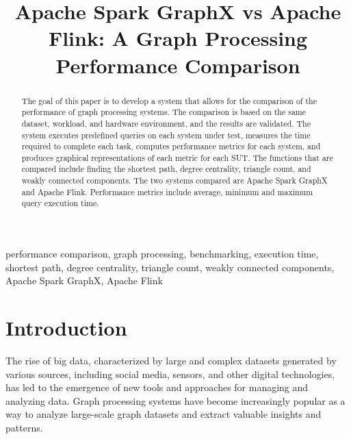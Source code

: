 \documentclass[conference]{IEEEtran}
\begin{document}
\title{Apache Spark GraphX vs Apache Flink: A Graph Processing Performance Comparison\\
}

\author{
\and
{}
}

\maketitle

\begin{abstract}
The goal of this paper is to develop a system that allows for the comparison of the performance of graph processing systems. The comparison is based on the same dataset, workload, and hardware environment, and the results are validated. The system executes predefined queries on each system under test, measures the time required to complete each task, computes performance metrics for each system, and produces graphical representations of each metric for each SUT. The functions that are compared include finding the shortest path, degree centrality, triangle count, and weakly connected components. The two systems compared are Apache Spark GraphX and Apache Flink. Performance metrics include average, minimum and maximum query execution time.
\end{abstract}

\begin{IEEEkeywords}
performance comparison, graph processing, benchmarking, execution time, shortest path, degree centrality, triangle count, weakly connected components, Apache Spark GraphX, Apache Flink
\end{IEEEkeywords}

\section{\textbf{Introduction}}\label{intro}
The rise of big data, characterized by large and complex datasets generated by various sources, including social media, sensors, and other digital technologies, has led to the emergence of new tools and approaches for managing and analyzing data. Graph processing systems have become increasingly popular as a way to analyze large-scale graph datasets and extract valuable insights and patterns.
\end{document}
